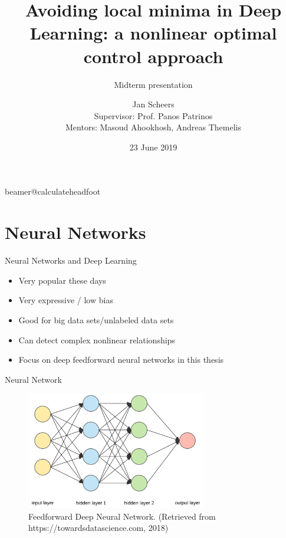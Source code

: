 \documentclass[11pt,t]{beamer}
\title[Midterm presentation]{Avoiding local minima in Deep Learning: a nonlinear optimal control approach} %
\subtitle{Midterm presentation}
\author{Jan Scheers \\
Supervisor: Prof. Panos Patrinos \\
Mentors: Masoud Ahookhosh, Andreas Themelis}
\date{23 June 2019}
\begin{document}
\csname beamer@calculateheadfoot\endcsname %


\begin{frame}
	\titlepage
\end{frame}

\section{Neural Networks}

\begin{frame}{Neural Networks and Deep Learning}
   \begin{itemize}
      \itemsep 15pt
      \item Very popular these days
      \item Very expressive / low bias
      \item Good for big data sets/unlabeled data sets
      \item Can detect complex nonlinear relationships
      \item Focus on deep feedforward neural networks in this thesis
   \end{itemize}
\end{frame}

\begin{frame}{Neural Network}
   \begin{figure}
	\centering
	\includegraphics[width=0.7\textwidth]{network}
	\caption{Feedforward Deep Neural Network. (Retrieved from https://towardsdatascience.com, 2018)}
	\end{figure}
\end{frame}
\end{document}
